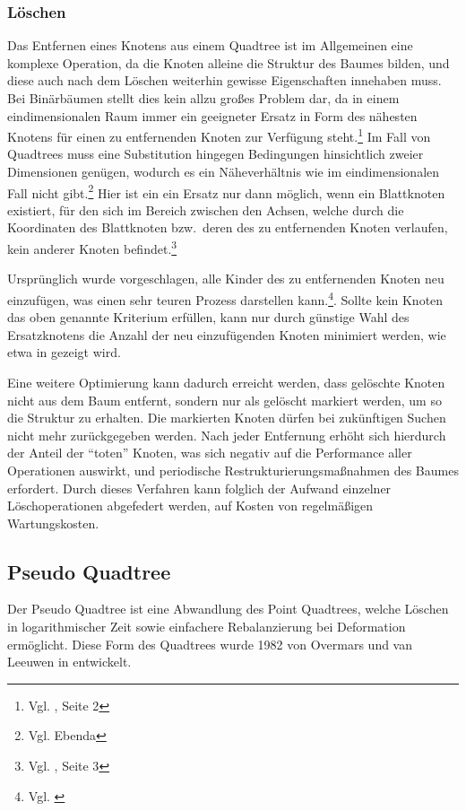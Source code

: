 \documentclass[%
			paper=a4,%
			DIV12,
			liststotoc,
			bibtotoc,
			draft=false,%
			titlepage
			]{scrartcl}
\newcommand{\zit}[3]{#1 \cite{#2}, #3}
\newcommand{\zitx}[2]{#1 \cite{#2}}
\newcommand{\footzit}[3]{\footnote{\zit{#1}{#2}{#3}}}
\newcommand{\footzitx}[2]{\footnote{\zitx{#1}{#2}}}
\begin{document}
\subsubsection{Löschen}
\label{sec:pointquadtree:delete}
Das Entfernen eines Knotens aus einem Quadtree ist im Allgemeinen eine komplexe Operation, da die Knoten alleine die Struktur des Baumes bilden, und diese auch nach dem Löschen weiterhin gewisse Eigenschaften innehaben muss.
Bei Binärbäumen stellt dies kein allzu großes Problem dar, da in einem eindimensionalen Raum immer ein geeigneter Ersatz in Form des nähesten Knotens für einen zu entfernenden Knoten zur Verfügung steht.\footzit{Vgl.}{DBLP:journals/cacm/Samet80a}{Seite 2}
Im Fall von Quadtrees muss eine Substitution hingegen Bedingungen hinsichtlich zweier Dimensionen genügen, wodurch es ein Näheverhältnis wie im eindimensionalen Fall nicht gibt.\footnote{Vgl. Ebenda}
Hier ist ein ein Ersatz nur dann möglich, wenn ein Blattknoten existiert, für den sich im Bereich zwischen den Achsen, welche durch die Koordinaten des Blattknoten bzw.\ deren des zu entfernenden Knoten verlaufen, kein anderer Knoten befindet.\footzit{Vgl.}{DBLP:journals/cacm/Samet80a}{Seite 3}

Ursprünglich wurde vorgeschlagen, alle Kinder des zu entfernenden Knoten neu einzufügen, was einen sehr teuren Prozess darstellen kann.\footzitx{Vgl.}{DBLP:journals/acta/FinkelB74}.
Sollte kein Knoten das oben genannte Kriterium erfüllen, kann nur durch günstige Wahl des Ersatzknotens die Anzahl der neu einzufügenden Knoten minimiert werden, wie etwa in \cite{DBLP:journals/cacm/Samet80a} gezeigt wird.

Eine weitere Optimierung kann dadurch erreicht werden, dass gelöschte Knoten nicht aus dem Baum entfernt, sondern nur als gelöscht markiert werden, um so die Struktur zu erhalten.
Die markierten Knoten dürfen bei zukünftigen Suchen nicht mehr zurückgegeben werden.
Nach jeder Entfernung erhöht sich hierdurch der Anteil der "`toten"' Knoten, was sich negativ auf die Performance aller Operationen auswirkt, und periodische Restrukturierungsmaßnahmen des Baumes erfordert.
Durch dieses Verfahren kann folglich der Aufwand einzelner Löschoperationen abgefedert werden, auf Kosten von regelmäßigen Wartungskosten.

\subsection{Pseudo Quadtree}
\label{sec:pseudoquadtree}
Der Pseudo Quadtree ist eine Abwandlung des Point Quadtrees, welche Löschen in logarithmischer Zeit sowie einfachere Rebalanzierung bei Deformation ermöglicht. Diese Form des Quadtrees wurde 1982 von Overmars und van Leeuwen in \cite{DBLP:journals/acta/OvermarsL82} entwickelt.
\end{document}
